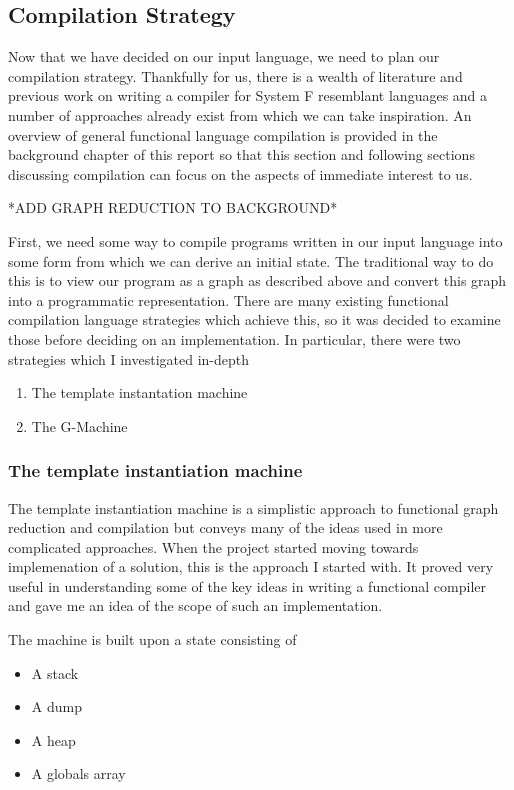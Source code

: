 \subsection{Compilation Strategy}
Now that we have decided on our input language, we need to plan our compilation
strategy. Thankfully for us, there is a wealth of literature and previous work
on writing a compiler for System F resemblant languages and a number of approaches
already exist from which we can take inspiration. An overview of general 
functional language compilation is provided in the background chapter of this
report so that this section and following sections discussing compilation can 
focus on the aspects of immediate interest to us.

*ADD GRAPH REDUCTION TO BACKGROUND*

First, we need some way to compile programs written in our input language into
some form from which we can derive an initial state. The traditional way to
do this is to view our program as a graph as described above and convert this
graph into a programmatic representation. There are many existing functional
compilation language strategies which achieve this, so it was decided to 
examine those before deciding on an implementation. In particular, there were
two strategies which I investigated in-depth

\begin{enumerate}
	\item The template instantation machine
	\item The G-Machine
\end{enumerate}

\subsubsection{The template instantiation machine} 
The template instantiation machine is a simplistic approach to
functional graph reduction and compilation but conveys many of 
the ideas used in more complicated approaches. When the project
started moving towards implemenation of a solution, this is the
approach I started with. It proved very useful in understanding
some of the key ideas in writing a functional compiler and gave
me an idea of the scope of such an implementation. 

The machine is built upon a state consisting of
\begin{itemize}
	\item A stack
	\item A dump
	\item A heap
	\item A globals array
\end{itemize}

